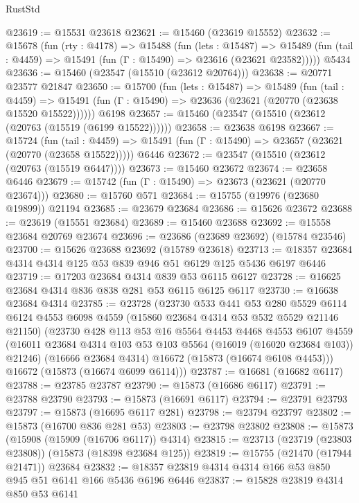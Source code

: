 \begin{lexlean}{RustStd}
\begin{coremodule}
@23619 := @15531 @23618
@23621 := @15460 (@23619 @15552)
@23632 := @15678
    (fun (rty : @4178) =>
    @15488
      (fun (lets : @15487) =>
      @15489 (fun (tail : @4459) => @15491 (fun (Γ : @15490) => @23616 (@23621 @23582)))))
    @5434
@23636 := @15460 (@23547 (@15510 (@23612 @20764)))
@23638 := @20771 @23577 @21847
@23650 := @15700
    (fun (lets : @15487) =>
    @15489
      (fun (tail : @4459) =>
      @15491 (fun (Γ : @15490) => @23636 (@23621 (@20770 (@23638 @15520 @15522))))))
    @6198
@23657 := @15460 (@23547 (@15510 (@23612 (@20763 (@15519 (@6199 @15522))))))
@23658 := @23638 @6198
@23667 := @15724
    (fun (tail : @4459) => @15491 (fun (Γ : @15490) => @23657 (@23621 (@20770 (@23658 @15522)))))
    @6446
@23672 := @23547 (@15510 (@23612 (@20763 (@15519 @6447))))
@23673 := @15460 @23672
@23674 := @23658 @6446
@23679 := @15742 (fun (Γ : @15490) => @23673 (@23621 (@20770 @23674)))
@23680 := @15760 @571
@23684 := @15755 (@19976 (@23680 @19899)) @21194
@23685 := @23679 @23684
@23686 := @15626 @23672
@23688 := @23619 (@15551 @23684)
@23689 := @15460 @23688
@23692 := @15558 @23684 @20769 @23674
@23696 := @23686 (@23689 @23692) (@15784 @23546)
@23700 := @15626 @23688 @23692 (@15789 @23618)
@23713 := @18357 @23684 @4314 @4314 @125 @53 @839 @946 @51 @6129 @125 @5436 @6197 @6446
@23719 := @17203 @23684 @4314 @839 @53 @6115 @6127
@23728 := @16625 @23684 @4314 @836 @838 @281 @53 @6115 @6125 @6117
@23730 := @16638 @23684 @4314
@23785 := @23728
    (@23730
      @533
      @441
      @53
      @280
      @5529
      @6114
      @6124
      @4553
      @6098
      @4559
      (@15860 @23684 @4314 @53 @532 @5529 @21146 @21150)
      (@23730
        @428
        @113
        @53
        @16
        @5564
        @4453
        @4468
        @4553
        @6107
        @4559
        (@16011 @23684 @4314 @103 @53 @103 @5564 (@16019 (@16020 @23684 @103)) @21246)
        (@16666 @23684 @4314)
        @16672
        (@15873 (@16674 @6108 @4453)))
      @16672
      (@15873 (@16674 @6099 @6114)))
@23787 := @16681 (@16682 @6117)
@23788 := @23785 @23787
@23790 := @15873 (@16686 @6117)
@23791 := @23788 @23790
@23793 := @15873 (@16691 @6117)
@23794 := @23791 @23793
@23797 := @15873 (@16695 @6117 @281)
@23798 := @23794 @23797
@23802 := @15873 (@16700 @836 @281 @53)
@23803 := @23798 @23802
@23808 := @15873 (@15908 (@15909 (@16706 @6117)) @4314)
@23815 := @23713 (@23719 (@23803 @23808)) (@15873 (@18398 @23684 @125))
@23819 := @15755 (@21470 (@17944 @21471)) @23684
@23832 := @18357 @23819 @4314 @4314 @166 @53 @850 @945 @51 @6141 @166 @5436 @6196 @6446
@23837 := @15828 @23819 @4314 @850 @53 @6141

\end{coremodule}
\end{lexlean}
